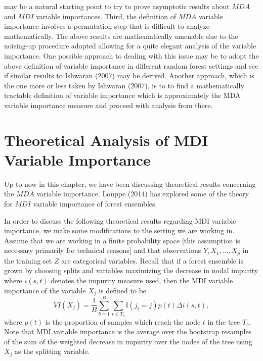 \documentclass[12pt,twoside]{reedthesis}
\theoremstyle{definition}
\theoremstyle{definition}
\theoremstyle{definition}
\theoremstyle{remark}
\begin{document}
may be a natural starting point to try to prove asymptotic results about
\(MDA\) and \(MDI\) variable importances. Third, the definition of
\(MDA\) variable importance involves a permutation step that is
difficult to analyze mathematically. The above results are
mathematically amenable due to the noising-up procedure adopted allowing
for a quite elegant analysis of the variable importance. One possible
approach to dealing with this issue may be to adopt the above definition
of variable importance in different random forest settings and see if
similar results to Ishwaran (2007) may be derived. Another approach,
which is the one more or less taken by Ishwaran (2007), is to to find a
mathematically tractable definition of variable importance which is
approximately the MDA variable importance measure and proceed with
analysis from there. \par

\section{Theoretical Analysis of MDI Variable
Importance}\label{theoretical-analysis-of-mdi-variable-importance}

Up to now in this chapter, we have been discussing theoretical results
concerning the \(MDA\) variable importance. Louppe (2014) has explored
some of the theory for \(MDI\) variable importance of forest ensembles.
\par

In order to discuss the following theoretical results regarding MDI
variable importance, we make some modifications to the setting we are
working in. Assume that we are working in a finite probability space
{[}this assumption is necessary primarily for technical reasons{]} and
that observations \(Y,X_1,\ldots,X_p\) in the training set \(Z\) are
categorical variables. Recall that if a forest ensemble is grown by
choosing splits and variables maximizing the decrease in nodal impurity
where \(i(s,t)\) denotes the impurity measure used, then the MDI
variable importance of the variable \(X_j\) is defined to be
\[VI(X_j)=\frac{1}{B}\sum_{b=1}^B \sum_{t\in T_b} \mathbb{I}(j_t=j)p(t)\Delta i(s,t),\]
where \(p(t)\) is the proportion of samples which reach the node \(t\)
in the tree \(T_b\). Note that MDI variable importance is the average
over the bootstrap resamples of the sum of the weighted decrease in
impurity over the nodes of the tree using \(X_j\) as the splitting
variable. \par
\end{document}
